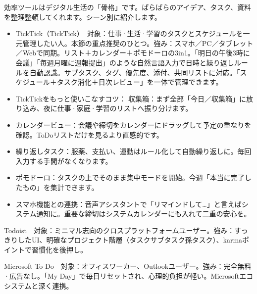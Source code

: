 


効率ツールはデジタル生活の「骨格」です。ばらばらのアイデア、タスク、資料を整理整頓してくれます。シーン別に紹介します。


\begin{itemize}
  \item TickTick（TickTick）　対象：仕事·生活·学習のタスクとスケジュールを一元管理したい人。本節の重点推奨のひとつ。強み：スマホ／PC／タブレット／Webで同期。リスト＋カレンダー＋ポモドーロの3in1。「明日の午後3時に会議」「毎週月曜に週報提出」のような自然言語入力で日時と繰り返しルールを自動認識。サブタスク、タグ、優先度、添付、共同リストに対応。「スケジュール＋タスク消化＋日次レビュー」を一体で管理できます。
  \item TickTickをもっと使いこなすコツ： 収集箱：まず全部「今日／収集箱」に放り込み、夜に仕事·家庭·学習のリストへ振り分けます。
  \item カレンダービュー：会議や締切をカレンダーにドラッグして予定の重なりを確認。ToDoリストだけを見るより直感的です。
  \item 繰り返しタスク：服薬、支払い、運動はルール化して自動繰り返しに。毎回入力する手間がなくなります。
  \item ポモドーロ：タスクの上でそのまま集中モードを開始。今週「本当に完了したもの」を集計できます。
  \item スマホ機能との連携：音声アシスタントで「リマインドして…」と言えばシステム通知に。重要な締切はシステムカレンダーにも入れて二重の安心を。
\end{itemize}

Todoist　対象：ミニマル志向のクロスプラットフォームユーザー。強み：すっきりしたUI、明確なプロジェクト階層（タスクサブタスク孫タスク）、karmaポイントで習慣化を後押し。

Microsoft To Do　対象：オフィスワーカー、Outlookユーザー。強み：完全無料·広告なし。「My Day」で毎日リセットされ、心理的負担が軽い。Microsoftエコシステムと深く連携。

